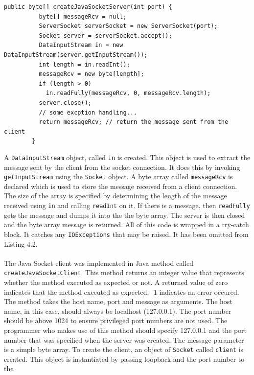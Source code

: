 \documentclass[12pt] {newrucsthesis}    %
\def\code#1{\texttt{#1}}
\begin{document}
      \begin {lstlisting}[caption=Java Sockets: \code{createJavaSocketServer}]
        public byte[] createJavaSocketServer(int port) {
          byte[] messageRcv = null;
          ServerSocket serverSocket = new ServerSocket(port);
          Socket server = serverSocket.accept();
          DataInputStream in = new DataInputStream(server.getInputStream());
          int length = in.readInt();
          messageRcv = new byte[length];
          if (length > 0)
            in.readFully(messageRcv, 0, messageRcv.length);
          server.close();
          // some excption handling...
          return messageRcv; // return the message sent from the client
        }
      \end{lstlisting}

      A \code{DataInputStream} object, called \code{in} is created. This object is used to extract the message
      sent by the client from the socket connection. It does this by invoking \code{getInputStream}
      using the \code{Socket} object.
      A byte array called \code{messageRcv} is declared which is used to store the message
      received from a client connection. The size of the array is specified by determining the
      length of the message received using \code{in} and calling \code{readInt} on it.
      If there is a message, then \code{readFully} gets the message and dumps it into the
      the byte array. The server is then closed and the byte array message is returned.
      All of this code is wrapped in a try-catch block. It catches any \code{IOExceptions}
      that may be raised. It has been omitted from Listing 4.2.
      \\\\
      The Java Socket client was implemented in Java method called \code{createJavaSocketClient}.
      This method returns an integer value that represents whether the method executed as expected or not.
      A returned value of zero indicates that the method executed as expected.
      -1 indicates an error occured. The method takes the host name, port
      and message as arguments. The host name, in this case, should always be localhost (127.0.0.1).
      The port number should be above 1024 to ensure privileged port numbers are not used. The programmer who makes
      use of this method should specify 127.0.0.1 and the port number that was specified when the server was
      created. The message parameter is a simple byte array. To create the client, an object of \code{Socket}
      called \code{client} is created. This object is instantiated by passing loopback and the port number to the
\end{document}
